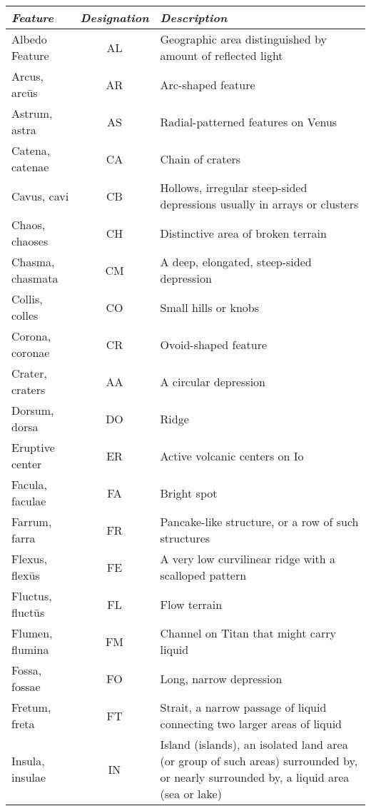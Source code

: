 \begin{longtable}{l|c|p{72mm}}\toprule
\emph{Feature}        & \emph{Designation} & \emph{Description}\\\midrule
Albedo Feature        & AL & Geographic area distinguished by amount of reflected light\\%
Arcus, arcūs          & AR & Arc-shaped feature\\%
Astrum, astra         & AS & Radial-patterned features on Venus \\\midrule
Catena, catenae       & CA & Chain of craters \\%
Cavus, cavi           & CB & Hollows, irregular steep-sided depressions usually in arrays or clusters\\%
Chaos, chaoses        & CH & Distinctive area of broken terrain\\%
Chasma, chasmata      & CM & A deep, elongated, steep-sided depression\\%
Collis, colles        & CO & Small hills or knobs\\%
Corona, coronae       & CR & Ovoid-shaped feature\\%
Crater, craters       & AA & A circular depression\\\midrule
Dorsum, dorsa         & DO & Ridge\\\midrule
Eruptive center       & ER & Active volcanic centers on Io\\\midrule
Facula, faculae       & FA & Bright spot\\%
Farrum, farra         & FR & Pancake-like structure, or a row of such structures\\%
Flexus, flexūs        & FE & A very low curvilinear ridge with a scalloped pattern\\%
Fluctus, fluctūs      & FL & Flow terrain\\%
Flumen, flumina       & FM & Channel on Titan that might carry liquid\\%
Fossa, fossae         & FO & Long, narrow depression\\%
Fretum, freta         & FT & Strait, a narrow passage of liquid connecting two larger areas of liquid\\\midrule
Insula, insulae       & IN & Island (islands), an isolated land area (or group of such areas) surrounded by, 
                             or nearly surrounded by, a liquid area (sea or lake)\\\midrule

\end{longtable}
